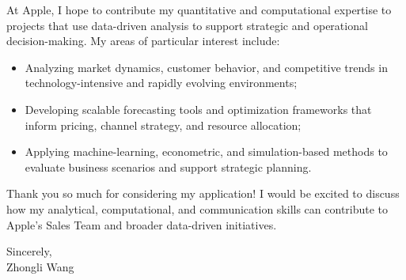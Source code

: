 \documentclass[11pt]{article}
\begin{document}
At Apple, I hope to contribute my quantitative and computational expertise to projects that use data-driven analysis to support strategic and operational decision-making. 
My areas of particular interest include:
\begin{itemize}
    \item Analyzing market dynamics, customer behavior, and competitive trends in technology-intensive and rapidly evolving environments;
    \item Developing scalable forecasting tools and optimization frameworks that inform pricing, channel strategy, and resource allocation;
    \item Applying machine-learning, econometric, and simulation-based methods to evaluate business scenarios and support strategic planning.
\end{itemize}


Thank you so much for considering my application! I would be excited to discuss how my analytical, computational, and communication skills can contribute to Apple’s Sales Team and broader data-driven initiatives.

\vspace{5mm}

\noindent Sincerely,\\[15mm]
\noindent Zhongli Wang
\end{document}
